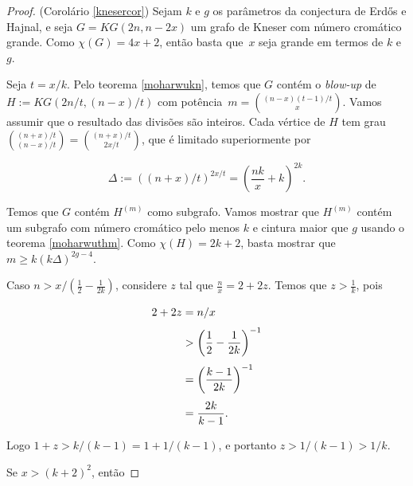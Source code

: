 \documentclass{article}
\begin{document}
\begin{proof}{(Corolário \ref{knesercor})}
Sejam $k$ e $g$ os parâmetros da conjectura de Erd\H{o}s e Hajnal, e seja $G = KG(2n,n-2x)$ um grafo de Kneser com número cromático grande. Como $\chi(G) = 4x+2$, então basta que~$x$ seja grande em termos de $k$ e $g$.

Seja $t = x/k$. Pelo teorema \ref{moharwukn}, temos que $G$ contém o \textit{blow-up} de $H := KG(2n/t, (n-x)/t)$ com potência~$m = \binom{(n-x)(t-1)/t}{x}$. Vamos assumir que o resultado das divisões são inteiros. Cada vértice de $H$ tem grau $\binom{(n+x)/t}{(n-x)/t} = \binom{(n+x)/t}{2x/t}$, que é limitado superiormente por

\[\Delta := ((n+x)/t)^{2x/t} = \left(\frac{nk}{x} + k\right)^{2k}.\]

Temos que $G$ contém $H^{(m)}$ como subgrafo. Vamos mostrar que $H^{(m)}$ contém um subgrafo com número cromático pelo menos $k$ e cintura maior que $g$ usando o teorema \ref{moharwuthm}. Como $\chi(H) = 2k+2$, basta mostrar que $m\geq k(k\Delta)^{2g-4}$.

Caso $n > x/(\frac{1}{2} - \frac{1}{2k})$, considere $z$ tal que $\frac{n}{x} = 2 + 2z$. Temos que $z > \frac{1}{k}$, pois

\begin{equation*}
\setlength{\jot}{6pt}
\begin{aligned}
2+2z &= n/x \\
& > \left(\frac{1}{2} - \frac{1}{2k}\right)^{-1}\\
& = \left(\frac{k-1}{2k}\right)^{-1}\\
& = \frac{2k}{k-1}.
\end{aligned}
\end{equation*}

Logo $1+z > k/(k-1) = 1+1/(k-1)$, e portanto $z > 1/(k-1) > 1/k$.

Se $x > (k+2)^2$, então




\end{proof}
\end{document}
